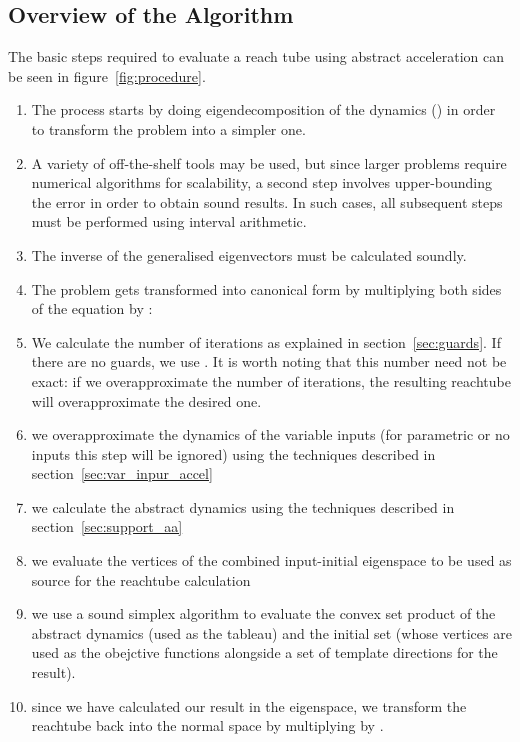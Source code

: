\documentclass{IEEEtran}
\begin{document}
\subsection{Overview of the Algorithm}\label{sec:absaccel_overview}


The basic steps required to evaluate a reach tube using abstract acceleration
can be seen in figure~\ref{fig:procedure}. 
\begin{enumerate}
\item The process starts by doing
eigendecomposition of the dynamics () in order to transform the
problem into a simpler one. 
\item A variety of off-the-shelf tools may be used, but
since larger problems require numerical algorithms for scalability, a second
step involves upper-bounding the error in order to obtain sound results. 
In such cases, all subsequent steps must be performed using interval arithmetic.
\item The inverse of the generalised eigenvectors must be calculated soundly.
\item The problem gets transformed into canonical form by multiplying both sides of the equation by :

\item We calculate the number of iterations as explained in section~\ref{sec:guards}. If there are no guards, we use . It is worth noting that this number need not be exact: if we overapproximate the number of iterations, the resulting reachtube will overapproximate the desired one.
\item we overapproximate the dynamics of the variable inputs (for parametric or no inputs this step will be ignored) using the techniques described in section~\ref{sec:var_inpur_accel}
\item we calculate the abstract dynamics using the techniques described in section~\ref{sec:support_aa}
\item we evaluate the vertices of the combined input-initial eigenspace to be used as source for the reachtube calculation
\item we use a sound simplex algorithm to evaluate the convex set product of the abstract dynamics (used as the tableau) and the initial set (whose vertices are used as the obejctive functions alongside a set of template directions for the result).
\item since we have calculated our result in the eigenspace, we transform the reachtube back into the normal space by multiplying by  .
\end{enumerate}
\end{document}
